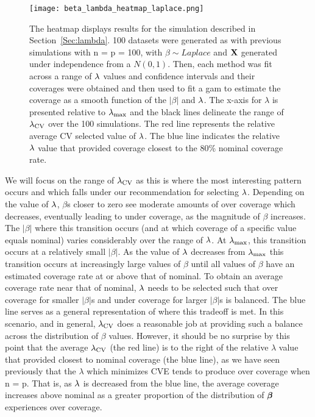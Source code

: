 \begin{figure}[hbtp]
  \begin{center}
  \texttt{[image: beta\_lambda\_heatmap\_laplace.png]}
  \caption{\label{Fig:beta_lambda_heatmap_laplace} The heatmap displays results for the simulation described in Section~\ref{Sec:lambda}. 100 datasets were generated as with previous simulations with n = p = 100, with $\beta \sim Laplace$ and $\mathbf{X}$ generated under independence from a $N(0,1)$. Then, each method was fit across a range of $\lambda$ values and confidence intervals and their coverages were obtained and then used to fit a gam to estimate the coverage as a smooth function of the $|\beta|$ and $\lambda$. The x-axis for $\lambda$ is presented relative to $\lambda_{\max}$ and the black lines delineate the range of $\lambda_{\textrm{CV}}$ over the 100 simulations. The red line represents the relative average CV selected value of $\lambda$. The blue line indicates the relative $\lambda$ value that provided coverage closest to the 80\% nominal coverage rate.}
  \end{center}
\end{figure}

We will focus on the range of $\lambda_{\textrm{CV}}$ as this is where the most interesting pattern occurs and which falls under our recommendation for selecting $\lambda$. Depending on the value of $\lambda$, $\beta$s closer to zero see moderate amounts of over coverage which decreases, eventually leading to under coverage, as the magnitude of $\beta$ increases. The $|\beta|$ where this transition occurs (and at which coverage of a specific value equals nominal) varies considerably over the range of $\lambda$. At $\lambda_{\max}$, this transition occurs at a relatively small $|\beta|$. As the value of $\lambda$ decreases from $\lambda_{\max}$ this transition occurs at increasingly large values of $\beta$ until all values of $\beta$ have an estimated coverage rate at or above that of nominal. To obtain an average coverage rate near that of nominal, $\lambda$ needs to be selected such that over coverage for smaller $|\beta|$s and under coverage for larger $|\beta|$s is balanced. The blue line serves as a general representation of where this tradeoff is met. In this scenario, and in general, $\lambda_{\textrm{CV}}$ does a reasonable job at providing such a balance across the distribution of $\beta$ values. However, it should be no surprise by this point that the average $\lambda_{\textrm{CV}}$ (the red line) is to the right of the relative $\lambda$ value that provided closest to nominal coverage (the blue line), as we have seen previously that the $\lambda$ which minimizes CVE tends to produce over coverage when n = p. That is, as $\lambda$ is decreased from the blue line, the average coverage increases above nominal as a greater proportion of the distribution of $\boldsymbol{\beta}$ experiences over coverage.

